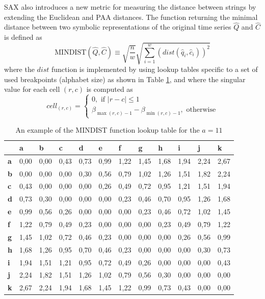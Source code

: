 SAX also introduces a new metric for measuring the distance between strings by extending the Euclidean and PAA \cite{citeulike:2946589} distances. 
The function returning the minimal distance between two symbolic representations of the original time series $\widehat{Q}$ and $\widehat{C}$ 
is defined as
\begin{equation}
\text{MINDIST}(\widehat{Q},\widehat{C}) \equiv \sqrt{ \frac{n}{w} } \sqrt{ \sum_{i=1}^{w} ( dist( \widehat{q}_{i}, \widehat{c}_{i} ) )^{2}}
\label{eq:sax_mindist}
\end{equation} 
where the $dist$ function is implemented by using lookup tables specific to a set of used breakpoints (alphabet size) as shown in 
Table \ref{tbl:sax_lookup}, and where the singular value for each cell $(r,c)$ is computed as 
\begin{equation}
cell_{(r,c)} = 
\begin{cases} 
0, \text{ if }\left| r-c \right| \leq 1 \\
\beta_{\max(r,c) - 1} - \beta_{\min(r,c) - 1}, \text{ otherwise}
\end{cases}
\label{eq:cell}
\end{equation}


\begin{table}
\caption[An example of the MINDIST function lookup table.]{An example of the MINDIST function lookup table for the $a=11$}
\label{tbl:sax_lookup}
\small
\begin{tabularx}{\textwidth}{|l|X|X|X|X|X|X|X|X|X|X|X|}
\hline
&\textbf{a}&\textbf{b}&\textbf{c}&\textbf{d}&\textbf{e}&\textbf{f}&\textbf{g}&\textbf{h}&\textbf{i}&\textbf{j}&\textbf{k} \\
\hline
\textbf{a}& 0,00 & 0,00 & 0,43 & 0,73 & 0,99 & 1,22 & 1,45 & 1,68 & 1,94 & 2,24 & 2,67 \\
\hline
\textbf{b}& 0,00 & 0,00 & 0,00 & 0,30 & 0,56 & 0,79 & 1,02 & 1,26 & 1,51 & 1,82 & 2,24 \\
\hline
\textbf{c}& 0,43 & 0,00 & 0,00 & 0,00 & 0,26 & 0,49 & 0,72 & 0,95 & 1,21 & 1,51 & 1,94 \\ 
\hline
\textbf{d}& 0,73 & 0,30 & 0,00 & 0,00 & 0,00 & 0,23 & 0,46 & 0,70 & 0,95 & 1,26 & 1,68 \\ 
\hline
\textbf{e}& 0,99 & 0,56 & 0,26 & 0,00 & 0,00 & 0,00 & 0,23 & 0,46 & 0,72 & 1,02 & 1,45 \\ 
\hline
\textbf{f}& 1,22 & 0,79 & 0,49 & 0,23 & 0,00 & 0,00 & 0,00 & 0,23 & 0,49 & 0,79 & 1,22 \\ 
\hline
\textbf{g}& 1,45 & 1,02 & 0,72 & 0,46 & 0,23 & 0,00 & 0,00 & 0,00 & 0,26 & 0,56 & 0,99 \\ 
\hline
\textbf{h}& 1,68 & 1,26 & 0,95 & 0,70 & 0,46 & 0,23 & 0,00 & 0,00 & 0,00 & 0,30 & 0,73 \\ 
\hline
\textbf{i}& 1,94 & 1,51 & 1,21 & 0,95 & 0,72 & 0,49 & 0,26 & 0,00 & 0,00 & 0,00 & 0,43 \\ 
\hline
\textbf{j}& 2,24 & 1,82 & 1,51 & 1,26 & 1,02 & 0,79 & 0,56 & 0,30 & 0,00 & 0,00 & 0,00 \\ 
\hline
\textbf{k}& 2,67 & 2,24 & 1,94 & 1,68 & 1,45 & 1,22 & 0,99 & 0,73 & 0,43 & 0,00 & 0,00 \\ 
\hline
\end{tabularx}
\end{table}

